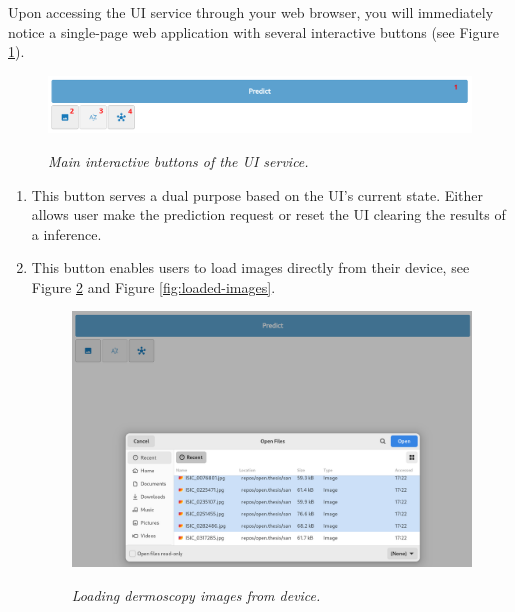 Upon accessing the UI service through your web browser, you will immediately
notice a single-page web application with several interactive buttons (see
Figure \ref{fig:ui-tools}).

\begin{figure}[H]
  \centering
  \includegraphics[width=\textwidth]{imatges/results/ui-tools.png}
  \caption[Main interactive buttons of the UI service]{\textit{Main interactive buttons of the UI service. }}
  {\label{fig:ui-tools}}
\end{figure}


\begin{enumerate}

  \item This button serves a dual purpose based on the UI's current state.
    Either allows user make the prediction request or reset the UI clearing the
    results of a inference.

  \item This button enables users to load images directly from their device,
    see Figure \ref{fig:selecting-imgs} and Figure \ref{fig:loaded-images}.

\begin{figure}[H]
  \centering
  \begin{adjustbox}{width=0.8\textwidth, trim={0.05cm 1.25cm 0cm 0.1cm}, clip}
    \includegraphics[width=\textwidth]{imatges/results/selecting-images.png}
  \end{adjustbox}
  \caption[Loading dermoscopy images from device]{\textit{Loading dermoscopy images from device.}}
  {\label{fig:selecting-imgs}}
\end{figure}


\end{enumerate}

